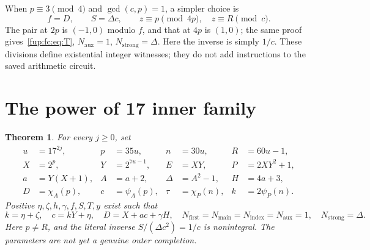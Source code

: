 \documentclass[11pt,letterpaper]{article}
\newtheorem{theorem}{Theorem}[section]
\theoremstyle{definition}\newtheorem{definition}[theorem]{Definition}
\theoremstyle{remark}\newtheorem{remark}[theorem]{Remark}
\newcommand{\D}{\Delta}
\newcommand{\ch}[2]{\chi_{#1}(#2)}\newcommand{\ps}[2]{\psi_{#1}(#2)}
\newcommand{\Nf}{N_{\mathrm{first}}}\newcommand{\Nm}{N_{\mathrm{main}}}\newcommand{\Ni}{N_{\mathrm{input}}}
\newcommand{\Na}{N_{\mathrm{aux}}}\newcommand{\Nk}{N_{\mathrm{index}}}\newcommand{\Nt}{N_{\mathrm{transport}}}
\newcommand{\Ns}{N_{\mathrm{strong}}}
\begin{document}
When $p\equiv3\pmod4$ and $\gcd(c,p)=1$, a simpler choice is
\begin{equation}
 f=D,\qquad S=\D c,\qquad
 z\equiv p\pmod{4p},\quad z\equiv R\pmod c.\label{fup:fc:eq:simpleaux}
\end{equation}
The pair at $2p$ is $(-1,0)$ modulo $f$, and that at $4p$ is $(1,0)$;
the same proof gives~\eqref{fup:fc:eq:T}, $\Na=1$, $\Ns=\D$.
Here the inverse is simply $1/c$.
These divisions define existential integer witnesses; they do not add
instructions to the saved arithmetic circuit.

\section{The power of 17 inner family}
\label{fup:fc:sec:family}
\begin{theorem}\label{fup:fc:thm:family}
For every $j\ge0$, set
\begin{align}
 u&=17^{2j},&p&=35u,&n&=30u,&R&=60u-1,\\
 X&=2^p,&Y&=2^{7u-1},&E&=XY,&P&=2XY^2+1,\\
 a&=Y(X+1),&A&=a+2,&\D&=A^2-1,&H&=4a+3,\\
 D&=\ch A p,&c&=\ps A p,&\tau&=\ch P n,&k&=2\ps P n.
 \label{fup:fc:eq:17family}
\end{align}
Positive $\eta,\zeta,h,\gamma,f,S,T,y$ exist such that
\[
 k=\eta+\zeta,\quad c=kY+\eta,\quad D=X+ac+\gamma H,
 \quad\Nf=\Nm=\Nk=\Na=1,\quad\Ns=\D.
\]
Here $p\ne R$, and the literal inverse $S/(\D c^2)=1/c$ is
nonintegral. The parameters are not yet a genuine outer completion.
\end{theorem}
\end{document}

